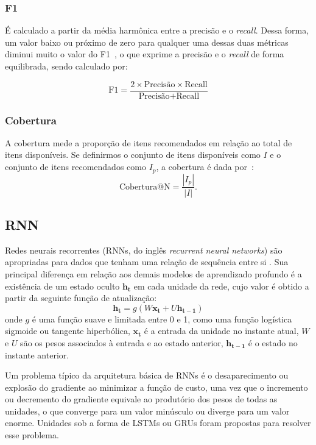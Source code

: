   \subsubsection{F1}
É calculado a partir da média harmônica entre a precisão e o \textit{recall}.
Dessa forma, um valor baixo ou próximo de zero para qualquer uma dessas duas
métricas diminui muito o valor do F1~\cite{sessionbaseddp}, o que exprime a precisão e
o \textit{recall} de forma equilibrada, sendo calculado por:

\begin{equation}
  \text{F1} = \frac{2 \times \text{Precisão} \times \text{Recall}}{\text{Precisão} + \text{Recall}}
\end{equation}

  \subsubsection{Cobertura}
  A cobertura mede a proporção de itens recomendados em relação ao total de
  itens disponíveis. Se definirmos o conjunto de itens disponíveis como $I$ e o
  conjunto de itens recomendados como $I_{p}$, a cobertura é dada por~\cite{sessionbaseddp}:
  \begin{equation}
    \text{Cobertura@N} = \frac{|I_{p}|}{|I|}.
  \end{equation}


\subsection{RNN}
Redes neurais recorrentes (RNNs, do inglês \textit{recurrent neural networks})
 são apropriadas para dados que tenham uma relação de sequência entre si
 \cite{gru4rec_1}. Sua principal diferença em relação aos demais modelos de
 aprendizado profundo é a existência de um estado oculto $\mathbf{h_t}$ em
 cada unidade da rede, cujo valor é obtido a partir da seguinte função de
 atualização:
\begin{equation}
    \mathbf{h_t} = g(W\mathbf{x_t} + U\mathbf{h_{t-1}})
\end{equation}
onde $g$ é uma função suave e limitada entre 0 e 1, como uma função logística
sigmoide ou tangente hiperbólica, $\mathbf{x_t}$ é a entrada da unidade no
instante atual, $W$ e $U$ são os pesos associados à entrada e ao estado
anterior, $\mathbf{h_{t-1}}$ é o estado no instante anterior.

Um problema típico da arquitetura básica de RNNs é o desaparecimento ou explosão
do gradiente ao minimizar a função de custo, uma vez que o incremento ou
decremento do gradiente equivale ao produtório dos pesos de todas as unidades, o
que converge para um valor minúsculo ou diverge para um valor enorme. Unidades
sob a forma de LSTMs ou GRUs foram propostas para resolver esse problema.


